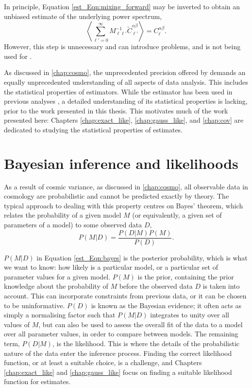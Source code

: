In principle, Equation \eqref{est_Eqn:mixing_forward} may be inverted to obtain an unbiased estimate of the underlying power spectrum,
\begin{equation}
\left\langle \sum_{\ell' = 0}^\infty M^{-1}_{\ell \ell'}
\widetilde{C}_{\ell'}^{\alpha \beta}  \right\rangle
= C_\ell^{\alpha \beta}.
\end{equation}
However, this step is unnecessary and can introduce problems, and is not being used for \Euclid{} \citep{Loureiro2021}.

As discussed in \autoref{chap:cosmo}, the unprecedented precision offered by \Euclid{} demands an equally unprecedented understanding of all aspects of data analysis. This includes the statistical properties of estimators. While the \pcl{} estimator has been used in previous analyses \citep[e.g.][]{Kogut2003, Hikage2019, Camacho2019, Loureiro2021}, a detailed understanding of its statistical properties is lacking, prior to the work presented in this thesis. This motivates much of the work presented here: Chapters \ref{chap:exact_like}, \ref{chap:gauss_like}, and \ref{chap:cov} are dedicated to studying the statistical properties of \pcl{} estimates.

\section{Bayesian inference and likelihoods}
\label{est_Sec:inference}

As a result of cosmic variance, as discussed in \autoref{chap:cosmo}, all observable data in cosmology are probabilistic and cannot be predicted exactly by theory. The typical approach to dealing with this property centres on Bayes' theorem, which relates the probability of a given model $M$ (or equivalently, a given set of parameters of a model) to some observed data $D$,
\begin{equation}
P \left( M | D \right)
= \frac{ P \left( D | M \right) P \left( M \right) }{ P \left( D \right)}.
\label{est_Eqn:bayes}
\end{equation}

$P \left( M | D \right)$ in Equation \eqref{est_Eqn:bayes} is the posterior probability, which is what we want to know: how likely is a particular model, or a particular set of parameter values for a given model. $P \left( M \right)$ is the prior, containing the prior knowledge about the probability of $M$ before the observed data $D$ is taken into account. This can incorporate constraints from previous data, or it can be chosen to be uninformative. $P \left( D \right)$ is known as the Bayesian evidence; it often acts as simply a normalising factor such that $P \left( M | D \right)$ integrates to unity over all values of $M$, but can also be used to assess the overall fit of the data to a model over all parameter values, in order to compare between models. The remaining term, $P \left( D | M \right)$, is the likelihood. This is where the details of the probabilistic nature of the data enter the inference process. Finding the correct likelihood function, or at least a suitable choice, is a challenge, and Chapters \ref{chap:exact_like} and \ref{chap:gauss_like} focus on finding a suitable likelihood function for \pcl{} estimates.

